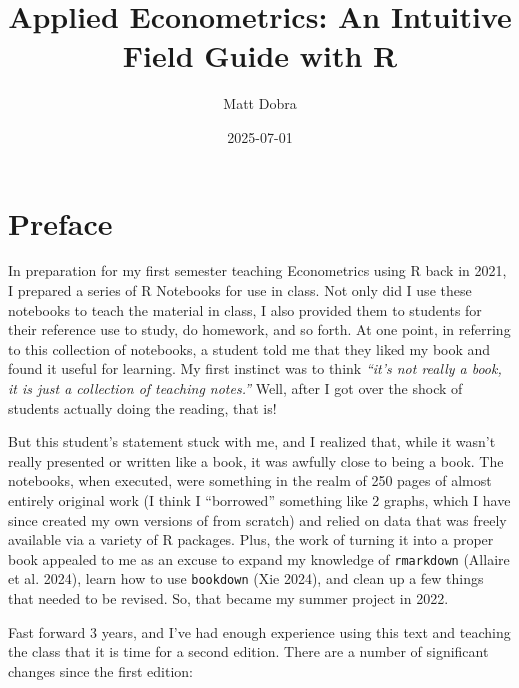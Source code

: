 \documentclass[
  letterpaper,
]{book}
\title{Applied Econometrics: An Intuitive Field Guide with R}
\author{Matt Dobra}
\date{2025-07-01}
\renewcommand*\contentsname{Table of contents}
\newcommand\contentsname{Table of contents}
\begin{document}
\frontmatter
\maketitle

\renewcommand*\contentsname{Table of contents}
{
\setcounter{tocdepth}{2}
\tableofcontents
}

\mainmatter
{}

\chapter*{Preface}\label{preface}


In preparation for my first semester teaching Econometrics using R back
in 2021, I prepared a series of R Notebooks for use in class. Not only
did I use these notebooks to teach the material in class, I also
provided them to students for their reference use to study, do homework,
and so forth. At one point, in referring to this collection of
notebooks, a student told me that they liked my book and found it useful
for learning. My first instinct was to think \emph{``it's not really a
book, it is just a collection of teaching notes.''} Well, after I got
over the shock of students actually doing the reading, that is!

But this student's statement stuck with me, and I realized that, while
it wasn't really presented or written like a book, it was awfully close
to being a book. The notebooks, when executed, were something in the
realm of 250 pages of almost entirely original work (I think I
``borrowed'' something like 2 graphs, which I have since created my own
versions of from scratch) and relied on data that was freely available
via a variety of R packages. Plus, the work of turning it into a proper
book appealed to me as an excuse to expand my knowledge of
\texttt{rmarkdown} (Allaire et al. 2024), learn how to use
\texttt{bookdown} (Xie 2024), and clean up a few things that needed to
be revised. So, that became my summer project in 2022.

Fast forward 3 years, and I've had enough experience using this text and
teaching the class that it is time for a second edition. There are a
number of significant changes since the first edition:
\end{document}

